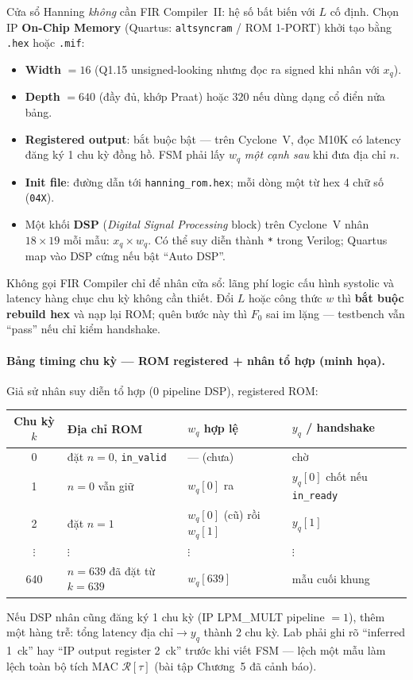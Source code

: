 Cửa sổ Hanning \emph{không} cần FIR Compiler~II: hệ số bất biến với $L$ cố định. Chọn IP \textbf{On-Chip Memory} (Quartus: \texttt{altsyncram} / ROM 1-PORT) khởi tạo bằng \texttt{.hex} hoặc \texttt{.mif}:

\begin{itemize}[leftmargin=1.4em]
\item \textbf{Width} $= 16$ (Q1.15 unsigned-looking nhưng đọc ra signed khi nhân với $x_q$).
\item \textbf{Depth} $= 640$ (đầy đủ, khớp Praat) hoặc $320$ nếu dùng dạng cổ điển nửa bảng.
\item \textbf{Registered output}: bắt buộc bật --- trên Cyclone~V, đọc M10K có latency đăng ký 1 chu kỳ đồng hồ. FSM phải lấy $w_q$ \emph{một cạnh sau} khi đưa địa chỉ $n$.
\item \textbf{Init file}: đường dẫn tới \texttt{hanning\_rom.hex}; mỗi dòng một từ hex 4 chữ số (\texttt{04X}).
\item Một khối \textbf{DSP} (\emph{Digital Signal Processing} block) trên Cyclone~V nhân $18\times 19$ mỗi mẫu: $x_q\times w_q$. Có thể suy diễn thành \texttt{*} trong Verilog; Quartus map vào DSP cứng nếu bật ``Auto DSP''.
\end{itemize}

Không gọi FIR Compiler chỉ để nhân cửa sổ: lãng phí logic cấu hình systolic và latency hàng chục chu kỳ không cần thiết. Đổi $L$ hoặc công thức $w$ thì \textbf{bắt buộc rebuild hex} và nạp lại ROM; quên bước này thì $F_0$ sai im lặng --- testbench vẫn ``pass'' nếu chỉ kiểm handshake.

\paragraph{Bảng timing chu kỳ --- ROM registered + nhân tổ hợp (minh họa).}
Giả sử nhân suy diễn tổ hợp (0 pipeline DSP), registered ROM:

\begin{center}\small
\begin{tabular}{@{}clll@{}}\toprule
Chu kỳ $k$ & Địa chỉ ROM & $w_q$ hợp lệ & $y_q$ / handshake \\
\midrule
0 & đặt $n{=}0$, \texttt{in\_valid} & --- (chưa) & chờ \\
1 & $n{=}0$ vẫn giữ & $w_q[0]$ ra & $y_q[0]$ chốt nếu \texttt{in\_ready} \\
2 & đặt $n{=}1$ & $w_q[0]$ (cũ) rồi $w_q[1]$ & $y_q[1]$ \\
$\vdots$ & $\vdots$ & $\vdots$ & $\vdots$ \\
640 & $n{=}639$ đã đặt từ $k{=}639$ & $w_q[639]$ & mẫu cuối khung \\
\bottomrule
\end{tabular}
\end{center}
Nếu DSP nhân cũng đăng ký 1 chu kỳ (IP LPM\_MULT pipeline $=1$), thêm một hàng trễ: tổng latency địa chỉ$\to y_q$ thành 2 chu kỳ. Lab phải ghi rõ ``inferred 1~ck'' hay ``IP output register 2~ck'' trước khi viết FSM --- lệch một mẫu làm lệch toàn bộ tích MAC $\mathcal{R}[\tau]$ (bài tập Chương~5 đã cảnh báo).

